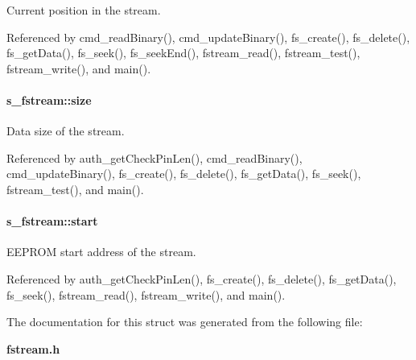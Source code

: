 Current position in the stream. 



Referenced by cmd\_\-readBinary(), cmd\_\-updateBinary(), fs\_\-create(), fs\_\-delete(), fs\_\-getData(), fs\_\-seek(), fs\_\-seekEnd(), fstream\_\-read(), fstream\_\-test(), fstream\_\-write(), and main().

\paragraph[{size}]{ {\bf s\_\-fstream::size}}\hfill\label{structs__fstream_ab803d160e579a1969b9803f19b7a0814}


Data size of the stream. 



Referenced by auth\_\-getCheckPinLen(), cmd\_\-readBinary(), cmd\_\-updateBinary(), fs\_\-create(), fs\_\-delete(), fs\_\-getData(), fs\_\-seek(), fstream\_\-test(), and main().

\paragraph[{start}]{ {\bf s\_\-fstream::start}}\hfill\label{structs__fstream_a4427473894e909d279b9fb12fba358e5}


EEPROM start address of the stream. 



Referenced by auth\_\-getCheckPinLen(), fs\_\-create(), fs\_\-delete(), fs\_\-getData(), fs\_\-seek(), fstream\_\-read(), fstream\_\-write(), and main().



The documentation for this struct was generated from the following file:\begin{DoxyCompactItemize}
\item 
{\bf fstream.h}\end{DoxyCompactItemize}
